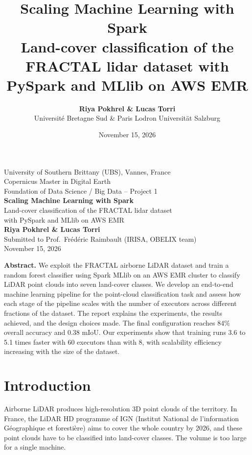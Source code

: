 \documentclass[a4paper, 11pt]{article} %
\title{\textbf{Scaling Machine Learning with Spark}\\[2mm]
	\large Land-cover classification of the FRACTAL lidar dataset with PySpark and MLlib on AWS EMR}
\author{\textbf{Riya Pokhrel \& Lucas Torri}\\
	Université Bretagne Sud \& Paris Lodron Universität Salzburg}
\date{November 15, 2026}
\begin{document}
\begin{titlepage}
\centering
\vspace*{1.5cm}
{\Large University of Southern Brittany (UBS), Vannes, France}\\[3mm]
Copernicus Master in Digital Earth\\
Foundation of Data Science / Big Data -- Project 1\\[2.5cm]
{\LARGE \textbf{Scaling Machine Learning with Spark}}\\[4mm]
{\large Land-cover classification of the FRACTAL lidar dataset\\ with PySpark and MLlib on AWS EMR}\\[2.5cm]
\textbf{Riya Pokhrel \& Lucas Torri}\\[2mm]
Submitted to Prof.\ Frédéric Raimbault (IRISA, OBELIX team)\\[2mm]
November 15, 2026\\[2cm]
\begin{minipage}{0.88\textwidth}
\small
\textbf{Abstract.}\;
We exploit the FRACTAL airborne LiDAR dataset and train a random forest classifier using Spark MLlib on an AWS EMR cluster to classify LiDAR point clouds into seven land-cover classes. We develop an end-to-end machine learning pipeline for the point-cloud classification task and assess how each stage of the pipeline scales with the number of executors across different fractions of the dataset. The report explains the experiments, the results achieved, and the design choices made. The final configuration reaches 84\% overall accuracy and 0.38 mIoU. Our experiments show that training runs 3.6 to 5.1 times faster with 60 executors than with 8, with scalability efficiency increasing with the size of the dataset.
\end{minipage}
\end{titlepage}

\tableofcontents

\section{Introduction}

Airborne LiDAR produces high-resolution 3D point clouds of the territory. In France, the LiDAR HD programme of IGN (Institut National de l'information Géographique et forestière) aims to cover the whole country by 2026, and these point clouds have to be classified into land-cover classes. The volume is too large for a single machine.
\end{document}
